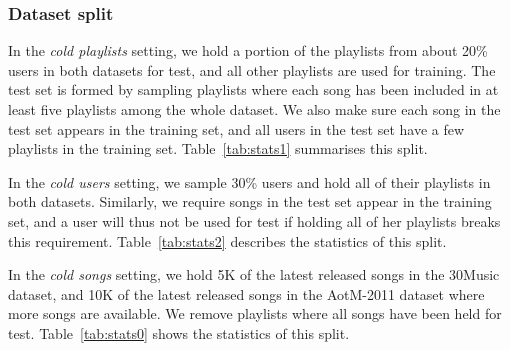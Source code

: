 \subsubsection{Dataset split}
In the \emph{cold playlists} setting,
we hold a portion of the playlists from about 20\% users in both datasets for test, 
and all other playlists are used for training.
The test set is formed by sampling playlists where each song has been included in 
at least five playlists among the whole dataset.
We also make sure each song in the test set appears in the training set,
and all users in the test set have a few %
playlists in the training set.
Table~\ref{tab:stats1} summarises this split. %

In the \emph{cold users} setting,
we sample 30\% users and hold all of their playlists in both datasets.
Similarly, we require songs in the test set appear in the training set,
and a user will thus not be used for test %
if holding all of her playlists breaks this requirement.
Table~\ref{tab:stats2} describes the statistics of this split. %

In the \emph{cold songs} setting,
we hold 5K of the latest released songs in the 30Music dataset,
and 10K of the latest released songs in the AotM-2011 dataset where more songs are available.
We remove playlists where all songs have been held for test. %
Table~\ref{tab:stats0} shows the statistics of this split. %


